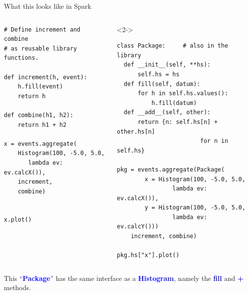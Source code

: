 \documentclass[aspectratio=169]{beamer}
\begin{document}
\begin{frame}[fragile]{What this looks like in Spark}
\begin{columns}
\small
\begin{verbatim}
# Define increment and combine
# as reusable library functions.

def increment(h, event):
    h.fill(event)
    return h

def combine(h1, h2):
    return h1 + h2

x = events.aggregate(
    Histogram(100, -5.0, 5.0,
       lambda ev: ev.calcX()),
    increment,
    combine)


x.plot()
\end{verbatim}

\begin{uncoverenv}<2->
\small
\begin{verbatim}
class Package:     # also in the library
  def __init__(self, **hs):
      self.hs = hs
  def fill(self, datum):
      for h in self.hs.values():
          h.fill(datum)
  def __add__(self, other):
      return {n: self.hs[n] + other.hs[n]
                        for n in self.hs}

pkg = events.aggregate(Package(
        x = Histogram(100, -5.0, 5.0,
                lambda ev: ev.calcX()),
        y = Histogram(100, -5.0, 5.0,
                lambda ev: ev.calcY()))
    increment, combine)

pkg.hs["x"].plot()
\end{verbatim}
\end{uncoverenv}
\end{columns}
\end{frame}

\begin{frame}{}
\begin{center}
\Large This ``\textcolor{blue}{\ttfamily \textbf{Package}}'' has the same interface as a \textcolor{blue}{\ttfamily \textbf{Histogram}}, namely the \textcolor{blue}{\ttfamily \textbf{fill}} and \textcolor{blue}{\ttfamily \textbf{+}} methods.
\end{center}
\end{frame}
\end{document}
